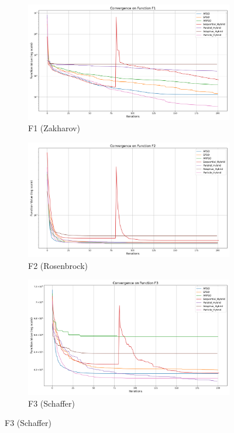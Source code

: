 \documentclass[conference]{IEEEtran}
\begin{document}
\begin{figure}[htbp]
\centering
\begin{subfigure}{0.32\linewidth}
    \centering
    \includegraphics[width=\linewidth]{../plots/exploitation/hybrid_convergence_f1.png}
    \caption{F1 (Zakharov)}
    \label{fig:hybrid_conv_f1}
\end{subfigure}
\hfill
\begin{subfigure}{0.32\linewidth}
    \centering
    \includegraphics[width=\linewidth]{../plots/exploitation/hybrid_convergence_f2.png}
    \caption{F2 (Rosenbrock)}
    \label{fig:hybrid_conv_f2}
\end{subfigure}
\hfill
\begin{subfigure}{0.32\linewidth}
    \centering
    \includegraphics[width=\linewidth]{../plots/exploitation/hybrid_convergence_f3.png}
    \caption{F3 (Schaffer)}
    \label{fig:hybrid_conv_f3}
\end{subfigure}


\end{figure}
\end{document}
